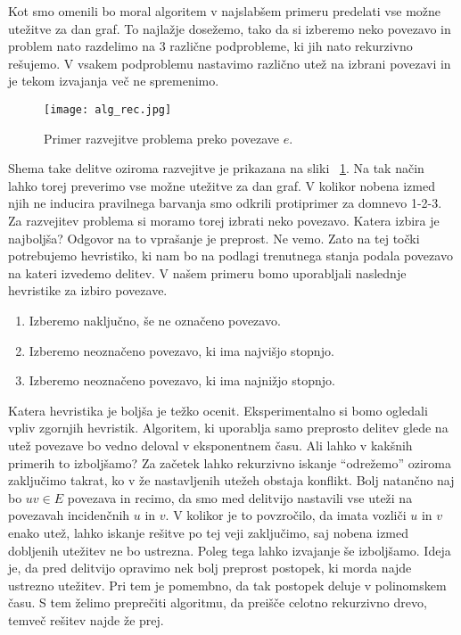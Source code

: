 \documentclass[12pt,a4paper,twoside]{article}
\theoremstyle{definition} %
\theoremstyle{plain} %
\numberwithin{equation}{section}  %
\begin{document}
Kot smo omenili bo moral algoritem v najslabšem primeru predelati vse možne utežitve za dan graf. To najlažje dosežemo, tako da si izberemo neko povezavo in problem nato razdelimo na $3$ različne podprobleme, ki jih nato rekurzivno rešujemo. V vsakem podproblemu nastavimo različno utež na izbrani povezavi in je tekom izvajanja več ne spremenimo.
 \begin{figure}[h!]
\caption{Primer razvejitve problema preko povezave $e$.}
\label{alg_rec}
\centering
    \texttt{[image: alg\_rec.jpg]}
    \end{figure}
Shema take delitve oziroma razvejitve je prikazana na sliki ~\ref{alg_rec}. Na tak način lahko torej preverimo vse možne utežitve za dan graf. V kolikor nobena izmed njih ne inducira pravilnega barvanja smo odkrili protiprimer za domnevo 1-2-3. Za razvejitev problema si moramo torej izbrati neko povezavo. Katera izbira je najboljša? Odgovor na to vprašanje je preprost. Ne vemo. Zato na tej točki potrebujemo hevristiko, ki nam bo na podlagi trenutnega stanja podala povezavo na kateri izvedemo delitev. V našem primeru bomo uporabljali naslednje hevristike za izbiro povezave.
\begin{enumerate}
\item Izberemo naključno, še ne označeno povezavo.
\item Izberemo neoznačeno povezavo, ki ima najvišjo stopnjo.
\item Izberemo neoznačeno povezavo, ki ima najnižjo stopnjo.
\end{enumerate}
Katera hevristika je boljša je težko ocenit. Eksperimentalno si bomo ogledali vpliv zgornjih hevristik. Algoritem, ki uporablja samo preprosto delitev glede na utež povezave bo vedno deloval v eksponentnem času. Ali lahko v kakšnih primerih to izboljšamo? Za začetek lahko rekurzivno iskanje ``odrežemo'' oziroma zaključimo takrat, ko v že nastavljenih utežeh obstaja konflikt. Bolj natančno naj bo $uv \in E$ povezava in recimo, da smo med delitvijo nastavili vse uteži na povezavah incidenčnih $u$ in $v$. V kolikor je to povzročilo, da imata vozliči $u$ in $v$ enako utež, lahko iskanje rešitve po tej veji zaključimo, saj nobena izmed dobljenih utežitev ne bo ustrezna. Poleg tega lahko izvajanje še izboljšamo. Ideja je, da pred delitvijo opravimo nek bolj preprost postopek, ki morda najde ustrezno utežitev. Pri tem je pomembno, da tak postopek deluje v polinomskem času. S tem želimo preprečiti algoritmu, da preišče celotno rekurzivno drevo, temveč rešitev najde že prej.
\end{document}
